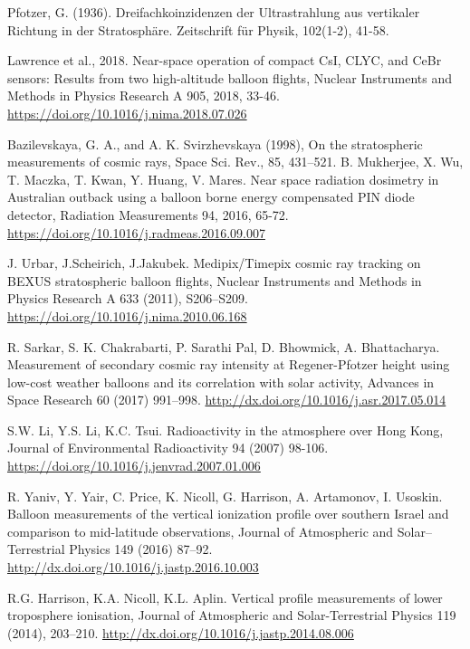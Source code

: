 \documentclass{Rpd}
\begin{document}
\begin{thebibliography}{99.}%

 Pfotzer, G. (1936). Dreifachkoinzidenzen der Ultrastrahlung aus vertikaler Richtung in der Stratosphäre. Zeitschrift für Physik, 102(1-2), 41-58.

 Lawrence et al., 2018. Near-space operation of compact CsI, CLYC, and CeBr sensors: Results from two high-altitude balloon flights, Nuclear Instruments and Methods in Physics Research A 905, 2018, 33-46. \url{https://doi.org/10.1016/j.nima.2018.07.026}

 Bazilevskaya, G. A., and A. K. Svirzhevskaya (1998), On the stratospheric measurements of cosmic rays, Space Sci. Rev., 85, 431–521.
 B. Mukherjee, X. Wu, T. Maczka, T. Kwan, Y. Huang, V. Mares. Near space radiation dosimetry in Australian outback using a balloon borne energy compensated PIN diode detector, Radiation Measurements 94, 2016, 65-72. \url{https://doi.org/10.1016/j.radmeas.2016.09.007}

 J. Urbar, J.Scheirich, J.Jakubek. Medipix/Timepix cosmic ray tracking on BEXUS stratospheric balloon flights, Nuclear Instruments and Methods in Physics Research A 633 (2011), S206–S209. \url{https://doi.org/10.1016/j.nima.2010.06.168}

 R. Sarkar, S. K. Chakrabarti, P. Sarathi Pal, D. Bhowmick, A. Bhattacharya. Measurement of secondary cosmic ray intensity at Regener-Pfotzer height using low-cost weather balloons and its correlation with solar activity, Advances in Space Research 60 (2017) 991–998. \url{http://dx.doi.org/10.1016/j.asr.2017.05.014}

 S.W. Li, Y.S. Li, K.C. Tsui. Radioactivity in the atmosphere over Hong Kong, Journal of Environmental Radioactivity 94 (2007) 98-106. \url{https://doi.org/10.1016/j.jenvrad.2007.01.006}

 R. Yaniv, Y. Yair, C. Price, K. Nicoll, G. Harrison, A. Artamonov, I. Usoskin. Balloon measurements of the vertical ionization profile over southern Israel and comparison to mid-latitude observations, Journal of Atmospheric and Solar–Terrestrial Physics 149 (2016) 87–92. \url{http://dx.doi.org/10.1016/j.jastp.2016.10.003}

 R.G. Harrison, K.A. Nicoll, K.L. Aplin. Vertical profile measurements of lower troposphere ionisation, Journal of Atmospheric and Solar-Terrestrial Physics 119 (2014), 203–210. \url{http://dx.doi.org/10.1016/j.jastp.2014.08.006}


\end{thebibliography}
\end{document}
